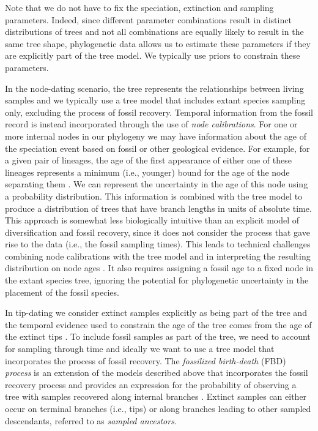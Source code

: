 Note that we do not have to fix the speciation, extinction and sampling parameters.
Indeed, since different parameter combinations result in distinct distributions of trees and not all combinations are equally likely to result in the same tree shape, phylogenetic data  allows us to estimate these parameters if they are explicitly part of the tree model.
We typically use priors to constrain these parameters.

In the node-dating scenario, the tree represents the relationships between living samples and we typically use a tree model that includes extant species sampling only, excluding the process of fossil recovery.
Temporal information from the fossil record is instead incorporated through the use of \textit{node calibrations}.
For one or more internal nodes in our phylogeny we may have information about the age of the speciation event based on fossil or other geological evidence.
For example, for a given pair of lineages, the age of the first appearance of either one of these lineages represents a minimum (i.e., younger) bound for the age of the node separating them \citep{Parham2012}.
We can represent the uncertainty in the age of this node using a probability distribution. %
This information is combined with the tree model to produce a distribution of trees that have branch lengths in units of absolute time.
This approach is somewhat less biologically intuitive than an explicit model of diversification and fossil recovery, since it does not consider the process that gave rise to the data (i.e., the fossil sampling times).
This leads to technical challenges combining node calibrations with the tree model and in interpreting the resulting distribution on node ages \citep{Heled2012,Warnock2015}.
It also requires assigning a fossil age to a fixed node in the extant species tree, ignoring the potential for phylogenetic uncertainty in the placement of the fossil species.

In tip-dating we consider extinct samples explicitly as being part of the tree and the temporal evidence used to constrain the age of the tree comes from the age of the extinct tips \citep{Ronquist2012a}.
To include fossil samples as part of the tree, we need to account for sampling through time and ideally we want to use a tree model that incorporates the process of fossil recovery.
The \textit{fossilized birth-death} (FBD) \textit{process} is an extension of the models described above that incorporates the fossil recovery process and provides an expression for the probability of observing a tree with samples recovered along internal branches \citep{Stadler2010,Heath2014,Gavryushkina2014}.
Extinct samples can either occur on terminal branches (i.e., tips) or along branches leading to other sampled descendants, referred to as \textit{sampled ancestors}.

